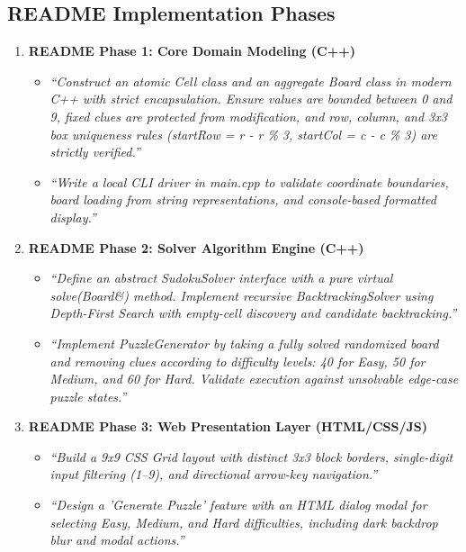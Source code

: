 \documentclass[12pt,a4paper,oneside]{book}
\begin{document}
\subsection{README Implementation Phases}
\begin{enumerate}
    \item \textbf{README Phase 1: Core Domain Modeling (C++)}
    \begin{itemize}
        \item \textit{``Construct an atomic Cell class and an aggregate Board class in modern C++ with strict encapsulation. Ensure values are bounded between 0 and 9, fixed clues are protected from modification, and row, column, and 3x3 box uniqueness rules (startRow = r - r \% 3, startCol = c - c \% 3) are strictly verified.''}
        \item \textit{``Write a local CLI driver in main.cpp to validate coordinate boundaries, board loading from string representations, and console-based formatted display.''}
    \end{itemize}

    \item \textbf{README Phase 2: Solver Algorithm Engine (C++)}
    \begin{itemize}
        \item \textit{``Define an abstract SudokuSolver interface with a pure virtual solve(Board\&) method. Implement recursive BacktrackingSolver using Depth-First Search with empty-cell discovery and candidate backtracking.''}
        \item \textit{``Implement PuzzleGenerator by taking a fully solved randomized board and removing clues according to difficulty levels: 40 for Easy, 50 for Medium, and 60 for Hard. Validate execution against unsolvable edge-case puzzle states.''}
    \end{itemize}

    \item \textbf{README Phase 3: Web Presentation Layer (HTML/CSS/JS)}
    \begin{itemize}
        \item \textit{``Build a 9x9 CSS Grid layout with distinct 3x3 block borders, single-digit input filtering (1--9), and directional arrow-key navigation.''}
        \item \textit{``Design a 'Generate Puzzle' feature with an HTML dialog modal for selecting Easy, Medium, and Hard difficulties, including dark backdrop blur and modal actions.''}
    \end{itemize}


\end{enumerate}
\end{document}

